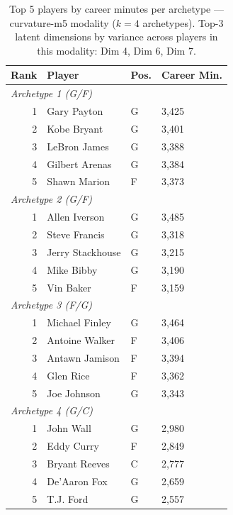 \begin{table}[htbp]
  \centering\small
  \begin{tabular}{rlll}
    \toprule
    Rank & Player & Pos. & Career Min. \\
    \midrule
    \multicolumn{4}{l}{\textit{Archetype 1 (G/F)}} \\
    \midrule
    1 & Gary Payton & G & 3,425 \\
    2 & Kobe Bryant & G & 3,401 \\
    3 & LeBron James & G & 3,388 \\
    4 & Gilbert Arenas & G & 3,384 \\
    5 & Shawn Marion & F & 3,373 \\
    \midrule[0.4pt]
    \multicolumn{4}{l}{\textit{Archetype 2 (G/F)}} \\
    \midrule
    1 & Allen Iverson & G & 3,485 \\
    2 & Steve Francis & G & 3,318 \\
    3 & Jerry Stackhouse & G & 3,215 \\
    4 & Mike Bibby & G & 3,190 \\
    5 & Vin Baker & F & 3,159 \\
    \midrule[0.4pt]
    \multicolumn{4}{l}{\textit{Archetype 3 (F/G)}} \\
    \midrule
    1 & Michael Finley & G & 3,464 \\
    2 & Antoine Walker & F & 3,406 \\
    3 & Antawn Jamison & F & 3,394 \\
    4 & Glen Rice & F & 3,362 \\
    5 & Joe Johnson & G & 3,343 \\
    \midrule[0.4pt]
    \multicolumn{4}{l}{\textit{Archetype 4 (G/C)}} \\
    \midrule
    1 & John Wall & G & 2,980 \\
    2 & Eddy Curry & F & 2,849 \\
    3 & Bryant Reeves & C & 2,777 \\
    4 & De'Aaron Fox & G & 2,659 \\
    5 & T.J. Ford & G & 2,557 \\
    \bottomrule
  \end{tabular}
  \caption{Top 5 players by career minutes per archetype --- curvature-m5 modality ($k=4$ archetypes). Top-3 latent dimensions by variance across players in this modality: Dim 4, Dim 6, Dim 7.}
  \label{tab:arch_reps_curvature_m5}
\end{table}

